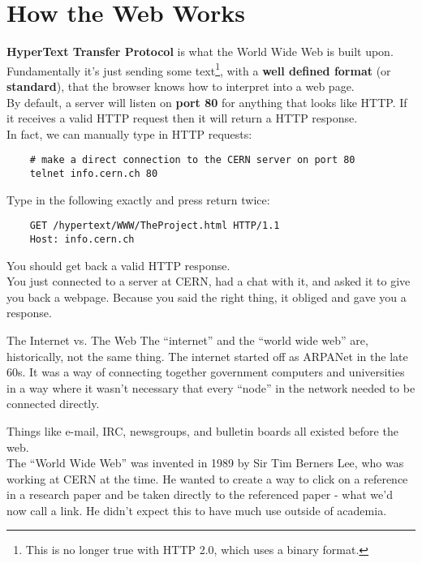 \section{How the Web Works}

\textbf{HyperText Transfer Protocol} is what the World Wide Web is built upon.
\\

Fundamentally it's just sending some text\footnote{This is no longer true with HTTP 2.0, which uses a binary format.}, with a \textbf{well defined format} (or \textbf{standard}), that the browser knows how to interpret into a web page.
\\

By default, a server will listen on \textbf{port 80} for anything that looks like HTTP. If it receives a valid HTTP request then it will return a HTTP response.
\\

In fact, we can manually type in HTTP requests:

\begin{verbatim}
    # make a direct connection to the CERN server on port 80
    telnet info.cern.ch 80
\end{verbatim}

Type in the following exactly and press return twice:

\begin{verbatim}
    GET /hypertext/WWW/TheProject.html HTTP/1.1
    Host: info.cern.ch
\end{verbatim}

You should get back a valid HTTP response.
\\

You just connected to a server at CERN, had a chat with it, and asked it to give you back a webpage. Because you said the right thing, it obliged and gave you a response.

\begin{infobox}{The Internet vs. The Web}
    The ``internet'' and the ``world wide web'' are, historically, not the same thing. The internet started off as ARPANet in the late 60s. It was a way of connecting together government computers and universities in a way where it wasn't necessary that every ``node'' in the network needed to be connected directly.
    \\


    Things like e-mail, IRC, newsgroups, and bulletin boards all existed before the web.
    \\

    The ``World Wide Web'' was invented in 1989 by Sir Tim Berners Lee, who was working at CERN at the time. He wanted to create a way to click on a reference in a research paper and be taken directly to the referenced paper - what we'd now call a link. He didn't expect this to have much use outside of academia.
\end{infobox}


